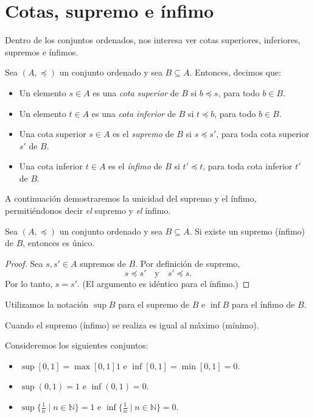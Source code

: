 \section{Cotas, supremo e ínfimo}

Dentro de los conjuntos ordenados, nos interesa ver cotas superiores, inferiores, supremos e ínfimos.

\begin{definition}
	Sea $(A, \preceq)$ un conjunto ordenado y sea $B \subseteq A$. Entonces, decimos que:
	\begin{itemize}
		\item Un elemento $s \in A$ es una \emph{cota superior} de $B$ si $b \preceq s$, para todo $b \in B$.
		\item Un elemento $t \in A$ es una \emph{cota inferior} de $B$ si $t \preceq b$, para todo $b \in B$.
		\item Una cota superior $s \in A$ es el \emph{supremo} de $B$ si $s \preceq s'$, para toda cota superior $s'$ de $B$.
		\item Una cota inferior $t \in A$ es el \emph{ínfimo} de $B$ si $t' \preceq t$, para toda cota inferior $t'$ de $B$.
	\end{itemize}
\end{definition}

A continuación demostraremos la unicidad del supremo y el ínfimo, permitiéndonos decir \textit{el} supremo y \textit{el} ínfimo.

\begin{proposition}
	Sea $(A, \preceq)$ un conjunto ordenado y sea $B \subseteq A$. Si existe un supremo (ínfimo) de $B$, entonces es único.
\end{proposition}

\begin{proof}
	Sea $s, s' \in A$ supremos de $B$. Por definición de supremo,
	\begin{equation*}
		s \preceq s' \quad \text{y} \quad s' \preceq s.
	\end{equation*}
	Por lo tanto, $s = s'$. (El argumento es idéntico para el ínfimo.)
\end{proof}

Utilizamos la notación $\sup B$ para el supremo de $B$ e $\inf B$ para el ínfimo de $B$.

\begin{remark}
	Cuando el supremo (ínfimo) se realiza es igual al máximo (mínimo).
\end{remark}

\begin{example}
	Consideremos los siguientes conjuntos:
	\begin{itemize}
		\item $\sup [0, 1] = \max [0, 1] 1$ e $\inf [0, 1] = \min [0, 1] = 0$.
		\item $\sup (0, 1) = 1$ e $\inf (0, 1) = 0$.
		\item $\sup\{ \frac{1}{n} \mid n \in \mathbb{N} \} = 1$ e $\inf\{ \frac{1}{n} \mid n \in \mathbb{N} \} = 0$.
	\end{itemize}
\end{example}

